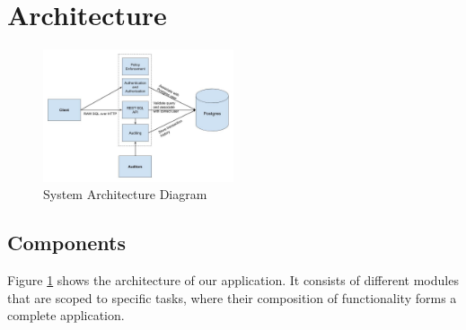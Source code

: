 \documentclass[sigconf]{acmart}
\begin{document}
\section{Architecture}
\begin{figure}[ht]
      \includegraphics[width=0.5\textwidth]{datasec_project.jpg}
  \caption{System Architecture Diagram}
    \label{fig:datasec_project}
\end{figure}

\subsection{Components}

Figure \ref{fig:datasec_project} shows the architecture of our application. It consists of different modules that are scoped to specific tasks, where their composition of functionality forms a complete application.
\end{document}
